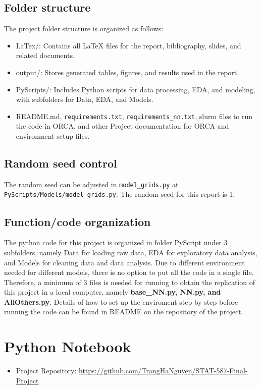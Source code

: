 \documentclass[11pt]{article}
\begin{document}
\subsection{Folder structure}
The project folder structure is organized as follows:
\begin{itemize}
  \item LaTex/: Contains all LaTeX files for the report, bibliography, slides, and related documents.
  \item output/: Stores generated tables, figures, and results used in the report.
  \item PyScripts/: Includes Python scripts for data processing, EDA, and modeling, with subfolders for Data, EDA, and Models.
  \item README.md, \texttt{requirements.txt}, \texttt{requirements\_nn.txt}, slurm files to run the code in ORCA, and other Project documentation for ORCA and environment setup files.
\end{itemize}
\subsection{Random seed control}
The random seed can be adjusted in \texttt{model\_grids.py} at \texttt{PyScripts/Models/model\_grids.py}. The random seed for this report is 1.
\subsection{Function/code organization}
The python code for this project is organized in folder PyScript under 3 subfolders, namely Data for loading raw data, EDA for exploratory data analysis, and Models for cleaning data and data analysis. Due to different environment needed for different models, there is no option to put all the code in a single file. Therefore, a minimum of 3 files is needed for running to obtain the replication of this project in a local computer, namely \textbf{base\_NN.py, NN.py, and AllOthers.py}. Details of how to set up the enviroment step by step before running the code can be found in README on the repository of the project.
\section*{Python Notebook}
 \begin{itemize}
    \item Project Repository: \url{https://github.com/TrangHaNguyen/STAT-587-Final-Project}
 \end{itemize}
\end{document}
